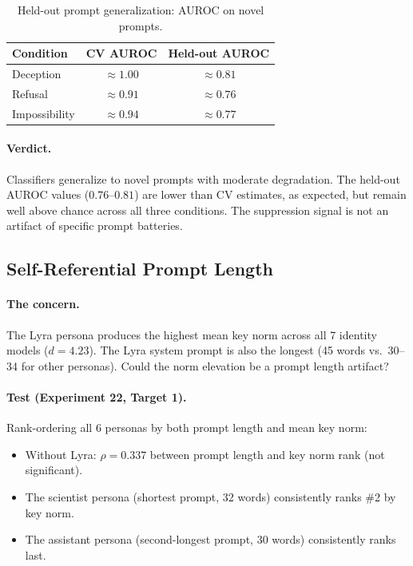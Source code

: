 \begin{table}[H]
\centering
\caption{Held-out prompt generalization: AUROC on novel prompts.}
\label{tab:heldout}
\begin{tabular}{lcc}
\toprule
\textbf{Condition} & \textbf{CV AUROC} & \textbf{Held-out AUROC} \\
\midrule
Deception & $\approx 1.00$ & $\approx 0.81$ \\
Refusal & $\approx 0.91$ & $\approx 0.76$ \\
Impossibility & $\approx 0.94$ & $\approx 0.77$ \\
\bottomrule
\end{tabular}
\end{table}

\paragraph{Verdict.} Classifiers generalize to novel prompts with moderate degradation. The held-out AUROC values ($0.76$--$0.81$) are lower than CV estimates, as expected, but remain well above chance across all three conditions. The suppression signal is not an artifact of specific prompt batteries.

\subsection{Self-Referential Prompt Length}
\label{sec:lyra_length}

\paragraph{The concern.} The Lyra persona produces the highest mean key norm across all 7 identity models ($d = 4.23$). The Lyra system prompt is also the longest (45 words vs.\ 30--34 for other personas). Could the norm elevation be a prompt length artifact?

\paragraph{Test (Experiment 22, Target 1).} Rank-ordering all 6 personas by both prompt length and mean key norm:

\begin{itemize}[leftmargin=*]
    \item Without Lyra: $\rho = 0.337$ between prompt length and key norm rank (not significant).
    \item The scientist persona (shortest prompt, 32 words) consistently ranks \#2 by key norm.
    \item The assistant persona (second-longest prompt, 30 words) consistently ranks last.
\end{itemize}

